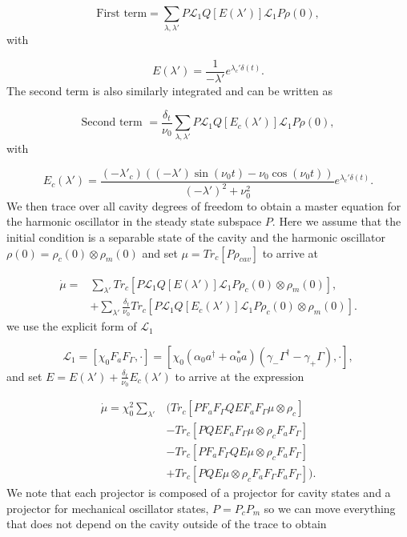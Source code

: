 \documentclass[reprint, amsmath,amssymb, aps,pra]{revtex4-1}
\begin{document}
\begin{equation}
\text{First term}=\sum_{\lambda,\lambda'}P \mathcal{L}_1Q[E(\lambda')]\mathcal{L}_1P\rho(0),
\end{equation} with

\begin{equation}
E(\lambda') = \frac{1}{-\lambda'}e^{\lambda_c'\delta(t)}.
\end{equation} The second term is also similarly integrated and can be written as

\begin{equation}
\text{Second term } =\frac{\delta_t}{\nu_0}\sum_{\lambda,\lambda'}P\mathcal{L}_1Q[E_c(\lambda')]\mathcal{L}_1P\rho(0),
\end{equation} with

\begin{equation}
E_c(\lambda')=\frac{(-\lambda'_c)((-\lambda')\sin(\nu_0 t)-\nu_0\cos(\nu_0t))}{(-\lambda')^2 + \nu_0^2}e^{\lambda_c'\delta(t)}.
\end{equation} We then trace over all cavity degrees of freedom to obtain a master equation for the harmonic oscillator in the steady state subspace $P$. Here we assume that the initial condition is a separable state of the cavity and the harmonic oscillator $\rho(0)=\rho_{c}(0)\otimes\rho_{m}(0)$  and  set $\mu = Tr_c[P\rho_{cav}]$ to arrive at 

\begin{align}
\dot{\mu}=&\sum_{\lambda'}Tr_c[P \mathcal{L}_1Q[E(\lambda')]\mathcal{L}_1P\rho_{c}(0)\otimes\rho_{m}(0) ],\\
&+\sum_{\lambda'}\frac{\delta_t}{\nu_0}Tr_c[P\mathcal{L}_1Q[E_c(\lambda')]\mathcal{L}_1P\rho_{c}(0)\otimes\rho_{m}(0) ]\nonumber.
\end{align} we use the explicit form of $\mathcal{L}_1$ 

\begin{equation}
\mathcal{L}_1 = [\chi_0 F_aF_\Gamma,\cdot] = [\chi_0(\alpha_0 a^\dagger + \alpha_0^* a)(\gamma_-\Gamma^\dagger-\gamma_+\Gamma),\cdot],
\end{equation}and set $E= E(\lambda') +\frac{\delta_t}{\nu_0} E_c(\lambda')$ to  arrive at the expression

\begin{align*}
\dot{\mu} = \chi_0^2 \sum_{\lambda'}&( Tr_c[PF_aF_\Gamma QEF_aF_\Gamma \mu \otimes \rho_{c}]\\
&- Tr_c[PQEF_aF_\Gamma\mu \otimes \rho_{c} F_aF_\Gamma ]\nonumber \\
&-Tr_c[PF_aF_\Gamma QE\mu \otimes \rho_{c} F_aF_\Gamma ] \nonumber\\ 
&+Tr_c[PQE\mu \otimes \rho_{c}F_aF_\Gamma  F_aF_\Gamma ]). \nonumber
\end{align*}  We note that each projector is composed of a projector for cavity states and a projector for mechanical oscillator states, $P=P_c P_m$ so we can move everything that does not depend on the cavity outside of the trace to obtain
\end{document}
